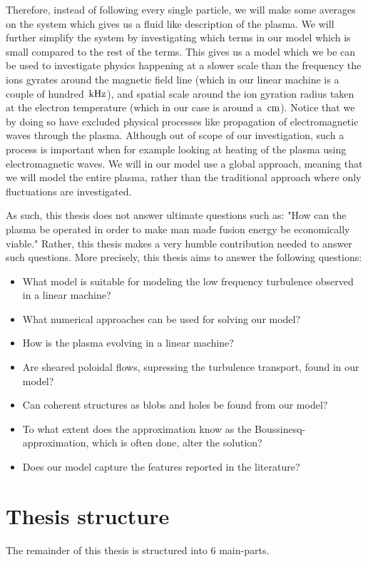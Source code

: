 Therefore, instead of following every single particle, we will make some averages on the system which gives us a fluid like description of the plasma.
We will further simplify the system by investigating which terms in our model which is small compared to the rest of the terms.
This gives us a model which we be can be used to investigate physics happening at a slower scale than the frequency the ions gyrates around the magnetic field line (which in our linear machine is a couple of hundred $\, \text{kHz}$), and spatial scale around the ion gyration radius taken at the electron temperature (which in our case is around a $\, \text{cm}$).
Notice that we by doing so have excluded physical processes like propagation of electromagnetic waves through the plasma.
Although out of scope of our investigation, such a process is important when for example looking at heating of the plasma using electromagnetic waves.
We will in our model use a global approach, meaning that we will model the entire plasma, rather than the traditional approach where only fluctuations are investigated.

As such, this thesis does not answer ultimate questions such as:
"How can the plasma be operated in order to make man made fusion energy be economically viable."
Rather, this thesis makes a very humble contribution needed to answer such questions.
More precisely, this thesis aims to answer the following questions:
%
\begin{itemize}[noitemsep]
    \item What model is suitable for modeling the low frequency turbulence observed in a linear machine?
    \item What numerical approaches can be used for solving our model?
    \item How is the plasma evolving in a linear machine?
    \item Are sheared poloidal flows, supressing the turbulence transport, found in our model?
    \item Can coherent structures as blobs and holes be found from our model?
    \item To what extent does the approximation know as the Boussinesq-approximation, which is often done, alter the solution?
    \item Does our model capture the features reported in the literature?
\end{itemize}

\section{Thesis structure}
%
The remainder of this thesis is structured into $6$ main-parts.

